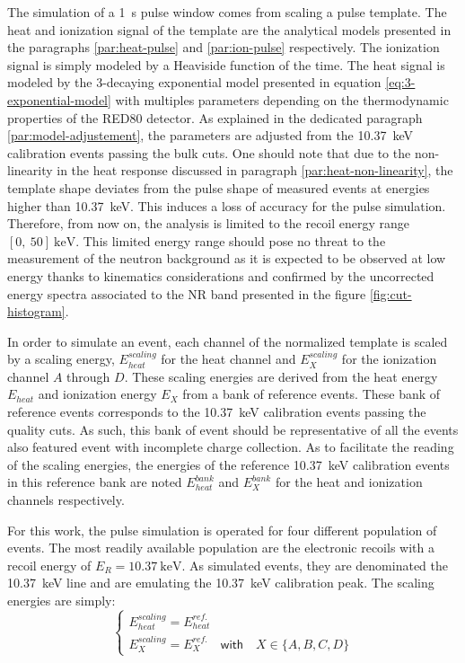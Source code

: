 
The simulation of a \SI{1}{\s} pulse window comes from scaling a pulse template. The heat and ionization signal of the template are the analytical models presented in the paragraphs \ref{par:heat-pulse} and \ref{par:ion-pulse} respectively. The ionization signal is simply modeled by a Heaviside function of the time. The heat signal is modeled by the 3-decaying exponential model presented in equation \ref{eq:3-exponential-model} with multiples parameters depending on the thermodynamic properties of the RED80 detector. As explained in the dedicated paragraph \ref{par:model-adjustement}, the parameters are adjusted from the \SI{10.37}{\kilo\eV} calibration events passing the bulk cuts. One should note that due to the non-linearity in the heat response discussed in paragraph \ref{par:heat-non-linearity}, the template shape deviates from the pulse shape of measured events at energies higher than \SI{10.37}{\kilo\eV}. This induces a loss of accuracy for the pulse simulation. Therefore, from now on, the analysis is limited to the recoil energy range $[0,\ 50]\ \si{\kilo\eV}$. This limited energy range should pose no threat to the measurement of the neutron background as it is expected to be observed at low energy thanks to kinematics considerations and confirmed by the uncorrected energy spectra associated to the NR band presented in the figure \ref{fig:cut-histogram}.

In order to simulate an event, each channel of the normalized template is scaled by a scaling energy, $E_{heat}^{scaling}$ for the heat channel and $E_{X}^{scaling}$ for the ionization channel $A$ through $D$. 
These scaling energies are derived from the heat energy $E_{heat}$ and ionization energy $E_{X}$ from a bank of reference events. These bank of reference events corresponds to the \SI{10.37}{\kilo\eV} calibration events passing the quality cuts. As such, this bank of event should be representative of all the events also featured event with incomplete charge collection. As to facilitate the reading of the scaling energies, the energies of the reference \SI{10.37}{\kilo\eV} calibration events in this reference bank are noted $E_{heat}^{bank}$ and $E_{X}^{bank}$  for the heat and ionization channels respectively.

For this work, the pulse simulation is operated for four different population of events. The most readily available population are the electronic recoils with a recoil energy of $E_R = \SI{10.37}{\kilo\eV}$. As simulated events, they are denominated the \SI{10.37}{\kilo\eV} line and are emulating the \SI{10.37}{\kilo\eV} calibration peak. The scaling energies are simply:
\begin{equation}
\begin{cases}
\displaystyle
E_{heat}^{scaling} = E_{heat}^{ref.}
\\
\displaystyle
E_{X}^{scaling} = E_{X}^{ref.} \quad \textsf{with} \quad X \in \{A,B,C,D\}
\end{cases}
\end{equation}

